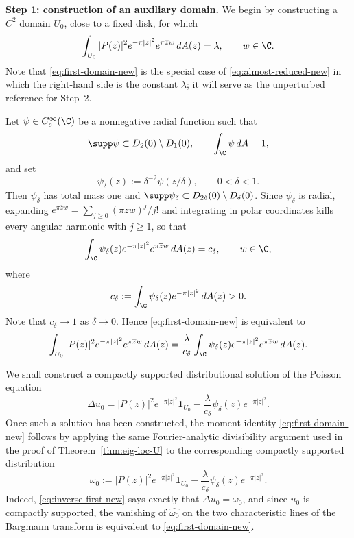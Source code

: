 \medskip
\noindent\textbf{Step 1: construction of an auxiliary domain.}
We begin by constructing a $C^2$ domain $U_0$, close to a fixed disk, for which
\begin{equation}\label{eq:first-domain-new}
\int_{U_0} |P(z)|^2 e^{-\pi|z|^2} e^{\pi \overline z w}\,dA(z)=\lambda,
\qquad w\in\C.
\end{equation}
Note that \eqref{eq:first-domain-new} is the special case of \eqref{eq:almost-reduced-new} in which the right-hand side is the constant $\lambda$; it will serve as the unperturbed reference for Step~2.

Let $\psi\in C_c^\infty(\C)$ be a nonnegative radial function such that
\[
\supp \psi \subset D_2(0)\setminus D_1(0),
\qquad
\int_\C \psi\,dA=1,
\]
and set
\[
\psi_\delta(z):=\delta^{-2}\psi(z/\delta),\qquad 0<\delta<1.
\]
Then $\psi_\delta$ has total mass one and $\supp\psi_\delta\subset D_{2\delta}(0)\setminus D_\delta(0)$. Since $\psi_\delta$ is radial, expanding $e^{\pi\overline z w}=\sum_{j\ge 0}(\pi\overline z w)^j/j!$ and integrating in polar coordinates kills every angular harmonic with $j\ge 1$, so that
\[
\int_{\C} \psi_\delta(z)e^{-\pi|z|^2}e^{\pi \overline z w}\,dA(z)=c_\delta,
\qquad w\in\C,
\]
where
\[
c_\delta:=\int_{\C}\psi_\delta(z)e^{-\pi|z|^2}\,dA(z)>0.
\]
Note that $c_\delta\to 1$ as $\delta\to 0$. Hence \eqref{eq:first-domain-new} is equivalent to
\begin{equation}\label{eq:second-domain-new}
\int_{U_0} |P(z)|^2 e^{-\pi|z|^2} e^{\pi \overline z w}\,dA(z)
=
\frac{\lambda}{c_\delta}
\int_{\C}\psi_\delta(z)e^{-\pi|z|^2}e^{\pi \overline z w}\,dA(z).
\end{equation}

We shall construct a compactly supported distributional solution of the Poisson equation
\begin{equation}\label{eq:inverse-first-new}
\Delta u_0
=
|P(z)|^2 e^{-\pi|z|^2}\mathbf{1}_{U_0}
-\frac{\lambda}{c_\delta}\psi_\delta(z)e^{-\pi|z|^2}.
\end{equation}
Once such a solution has been constructed, the moment identity \eqref{eq:first-domain-new} follows by applying the same Fourier-analytic divisibility argument used in the proof of Theorem~\ref{thm:eig-loc-U} to the corresponding compactly supported distribution
\[
\omega_0:=
|P(z)|^2e^{-\pi|z|^2}\mathbf 1_{U_0}
-\frac{\lambda}{c_\delta}\psi_\delta(z)e^{-\pi|z|^2}.
\]
Indeed, \eqref{eq:inverse-first-new} says exactly that $\Delta u_0=\omega_0$, and since $u_0$ is compactly supported, the vanishing of $\widehat{\omega_0}$ on the two characteristic lines of the Bargmann transform is equivalent to \eqref{eq:first-domain-new}.

